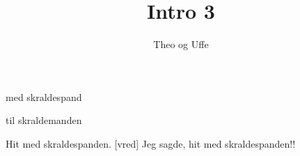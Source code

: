 \documentclass[11pt]{article}
\title{Intro 3}
\author{Theo og Uffe}
\begin{document}
\maketitle

\begin{sketch}

\begin{roles}
   med skraldespand
\end{roles}

\begin{props}
   til skraldemanden
\end{props}

 Hit med skraldespanden.
 [vred] Jeg sagde, hit med skraldespanden!!

\end{sketch}
\end{document}
